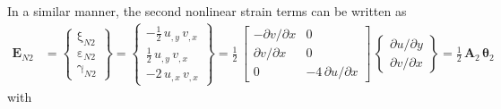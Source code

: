 In a similar manner, the second nonlinear strain terms can be written as
\begin{equation}
\begin{aligned}
\mathbf{E}_{N2} & =  \begin{Bmatrix}
\mathrm \xi_{N2} \\
\mathrm \varepsilon_{N2} \\
\mathrm \gamma_{N2} \end{Bmatrix} =
\begin{Bmatrix}
-\tfrac{1}{2} \, u_{,y} \, v_{,x}  \\
\tfrac{1}{2} \, u_{,y} \, v_{,x} \\
-2 \, u_{,x} \, v_{,x} \end{Bmatrix} = \frac{1}{2} \, \begin{bmatrix}
- \partial v / \partial x &  0 \\
\partial v / \partial x & 0 \\
0 & -4 \, \partial u / \partial x  \end{bmatrix} \, \begin{Bmatrix}
\partial u / \partial y\\
\partial v / \partial x
\end{Bmatrix} = \tfrac{1}{2} \, \mathbf{A}_2 \, \boldsymbol{\theta}_2
\end{aligned}
\end{equation}
with  
